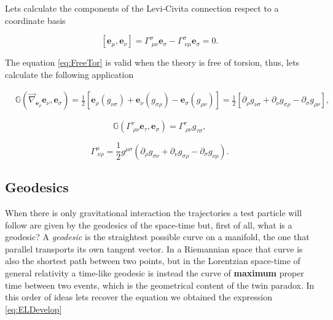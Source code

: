         Lets calculate the components of the Levi-Civita connection respect to a coordinate basis

        \begin{equation}\label{eq:FreeTor}
            [\mathbf{e}_{\mu},\mathbf{e}_{\nu}] = \Gamma^{\sigma}_{\;\mu\nu}\mathbf{e}_{\sigma} - \Gamma^{\sigma}_{\;\nu\mu}\mathbf{e}_{\sigma} = 0.
        \end{equation}

        The equation \ref{eq:FreeTor} is valid when the theory is free of torsion, thus, lets calculate the following application

        \begin{align*}
            &\mathbb{G}\left(\Vec{\nabla}_{\mathbf{e}_{\rho}}\mathbf{e}_{\nu} , \mathbf{e}_{\sigma}\right) = \frac{1}{2}\left[\mathbf{e}_{\rho}(g_{\nu\sigma}) + \mathbf{e}_{\nu}(g_{\sigma\rho}) - \mathbf{e}_{\sigma}(g_{\rho\nu}) \right] = \frac{1}{2}\left[\partial_{\rho}g_{\nu\sigma} + \partial_{\nu}g_{\sigma\rho} - \partial_{\sigma}g_{\rho\nu} \right],
        \end{align*}

        \begin{equation}
            \mathbb{G}\left(\Gamma^{\tau}_{\;\rho\nu}\mathbf{e}_{\tau},\mathbf{e}_{\sigma} \right) = \Gamma^{\tau}_{\;\rho\nu}g_{\tau\sigma},
        \end{equation}

        \begin{equation}
            \Gamma^{\mu}_{\;\nu\rho} = \frac{1}{2}g^{\mu\sigma}\left(\partial_{\rho}g_{\sigma\nu} + \partial_{\nu}g_{\sigma\rho} - \partial_{\sigma}g_{\nu\rho} \right).
        \end{equation}


    \subsection{Geodesics}

        When there is only gravitational interaction the trajectories a test particle will follow are given by the geodesics of the space-time but, first of all, what is a geodesic? A \textit{geodesic} is the straightest possible curve on a manifold, the one that parallel transports its own tangent vector. In a Riemannian space that curve is also the shortest path between two points, but in the Lorentzian space-time of general relativity a time-like geodesic is instead the curve of \textbf{maximum} proper time between two events, which is the geometrical content of the twin paradox. In this order of ideas lets recover the equation we obtained the expression \ref{eq:ELDevelop}

